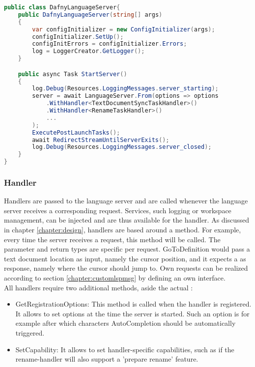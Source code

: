 \begin{lstlisting}[language=csharp, caption={Starting the Language Server}, captionpos=b, label={lst:serverstart}]
public class DafnyLanguageServer{
    public DafnyLanguageServer(string[] args)
    {
        var configInitializer = new ConfigInitializer(args);
        configInitializer.SetUp();
        configInitErrors = configInitializer.Errors;
        log = LoggerCreator.GetLogger();
    }

    public async Task StartServer()
    {
        log.Debug(Resources.LoggingMessages.server_starting);
        server = await LanguageServer.From(options => options
            .WithHandler<TextDocumentSyncTaskHandler>()
            .WithHandler<RenameTaskHandler>()
            ...
        );
        ExecutePostLaunchTasks();
        await RedirectStreamUntilServerExits();
        log.Debug(Resources.LoggingMessages.server_closed);
    }
}
\end{lstlisting}

\subsubsection{Handler}
Handlers are passed to the language server and are called whenever the language server receives a corresponding request.
Services, such logging or workspace management, can be injected and are thus available for the handler.
As discussed in chapter \ref{chapter:design}, handlers are based around a  method.
For example, every time the server receives a  request, this  method will be called.
The parameter and return types are specific per request.
GoToDefinition would pass a text document location as input, namely the cursor position, and it expects a  as response,
namely where the cursor should jump to.
Own requests can be realized according to section \ref{chapter:customlspmsg} by defining an own interface.\\

All handlers require two additional methods, aside the actual :
\begin{itemize}
    \item GetRegistrationOptions: This method is called when the handler is registered.
    It allows to set options at the time the server is started.
    Such an option is for example after which characters AutoCompletion should be automatically triggered.
    \item SetCapability: It allows to set handler-specific capabilities, such as if the rename-handler will also support a 'prepare rename' feature.
\end{itemize}

